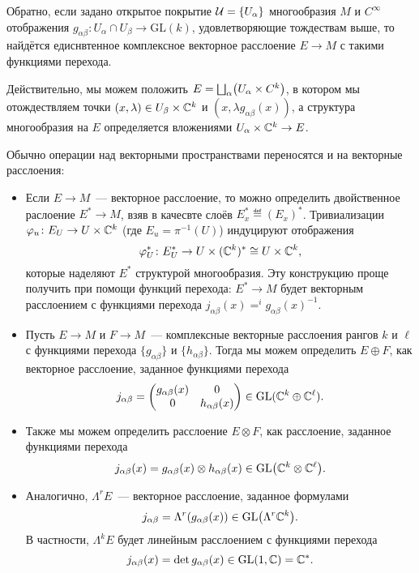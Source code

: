     Обратно, если задано открытое покрытие  $\mathcal{U} = \{ U_{\alpha} \}$ многообразия $M$ и $C^{\infty}$ отображения  $g_{\alpha \beta} \colon U_{\alpha} \cap U_{\beta} \to \mathrm{GL}(k)$, удовлетворяющие тождествам выше, то найдётся едиснвтенное комплексное векторное расслоение $E \to M$ с такими функциями перехода. 

    Действительно, мы можем положить $E = \bigsqcup_{\alpha}\lr*{U_{\alpha} \times C^k}$, в котором мы отождествляем точки $(x, \lambda) \in U_{\beta} \times \mathbb{C}^k$ и $(x, \lambda g_{\alpha \beta}(x))$, а структура многообразия на $E$ определяется вложениями $U_{\alpha} \times \mathbb{C}^k \to E$. 

    Обычно операции над векторными пространствами переносятся и на векторные расслоения: 

    \begin{itemize}
        \item Если $E \to M$~--- векторное расслоение, то можно определить двойственное раслоение $E^* \to M$, взяв в качесвте слоёв $E^*_x \eqdef (E_x)^*$. Тривиализации $\varphi_u\colon E_U \to U \times \mathbb{C}^k$ (где $E_u = \pi^{-1}(U)$) индуцируют отображения 
        \[
            \varphi_U^*\colon E^*_U \to U \times (\mathbb{C}^k)^* \cong U \times \mathbb{C}^k,
        \]
        которые наделяют $E^*$ структурой многообразия. Эту конструкцию проще получить при помощи функций перехода: 
        $E^* \to M$ будет векторным расслоением с функциями перехода $j_{\alpha \beta}(x) = ^{i}g_{\alpha \beta}(x)^{-1}$.

        \item Пусть $E \to M$ и $F \to M$~--- комплексные векторные расслоения рангов $k$ и $\ell$ с функциями перехода $\{ g_{\alpha \beta}\}$ и $\{ h_{\alpha \beta} \}$. Тогда мы можем определить $E \oplus F$, как векторное расслоение, заданное функциями перехода 
        \[ j_{\alpha \beta} = \begin{pmatrix} g_{\alpha \beta}(x) & 0 \\ 0 & h_{\alpha \beta}(x) \end{pmatrix} \in \mathrm{GL}(\mathbb{C}^k \oplus \mathbb{C}^{\ell}). \]
        \item Также мы можем определить расслоение $E \otimes F$, как расслоение, заданное функциями перехода 
        \[
            j_{\alpha \beta}(x) = g_{\alpha \beta}(x) \otimes h_{\alpha \beta}(x) \in \mathrm{GL}\lr*{\C^k \otimes \C^{\ell}}.
        \]
        \item Аналогично, $\Lambda^{r}E$~--- векторное расслоение, заданное формулами 
        \[
            j_{\alpha \beta} = \Lambda^r(g_{\alpha \beta}(x)) \in \mathrm{GL}\lr*{\Lambda^r \C^k}.
        \]
        В частности, $\Lambda^k E$ будет линейным расслоением с функциями перехода 
        \[
            j_{\alpha \beta}(x) = \det{g_{\alpha \beta}(x)} \in \mathrm{GL}(1, \mathbb{C}) = \mathbb{C}^*.
        \]
    \end{itemize}

